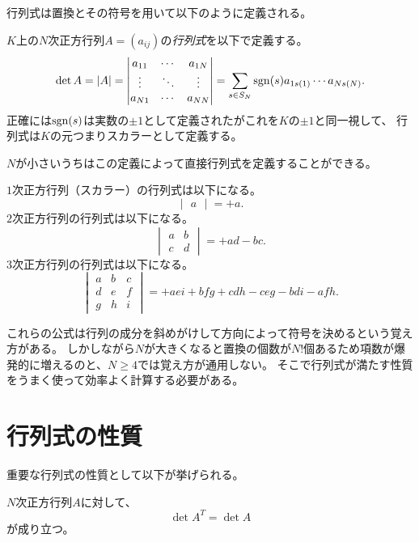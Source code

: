 行列式は置換とその符号を用いて以下のように定義される。

\begin{definition}[行列式]
$K$上の$N$次正方行列$A = (a_{i j})$の\emph{行列式}を以下で定義する。
$$
\det A = \abs{A} =
\begin{vmatrix}
a_{1 1} & \cdots & a_{1 N} \\
\vdots & \ddots & \vdots \\
a_{N 1} & \cdots & a_{N N} \\
\end{vmatrix}
= \sum_{s \in S_N}\operatorname{sgn}(s) a_{1 s(1)}\cdots a_{N s(N)}.
$$
正確には$\operatorname{sgn}(s)$は実数の$\pm 1$として定義されたがこれを$K$の$\pm 1$と同一視して、
行列式は$K$の元つまりスカラーとして定義する。
\end{definition}

$N$が小さいうちはこの定義によって直接行列式を定義することができる。

\begin{proposition}[サラスの公式]
$1$次正方行列（スカラー）の行列式は以下になる。
$$
\begin{vmatrix}a\end{vmatrix}
= +a.
$$
$2$次正方行列の行列式は以下になる。
$$
\begin{vmatrix}a & b \\ c & d\end{vmatrix}
= +a d-b c.
$$
$3$次正方行列の行列式は以下になる。
$$
\begin{vmatrix}a & b & c \\ d & e & f \\ g & h & i\end{vmatrix}
= +a e i+b f g+c d h-c e g-b d i-a f h.
$$
\end{proposition}

これらの公式は行列の成分を斜めがけして方向によって符号を決めるという覚え方がある。
しかしながら$N$が大きくなると置換の個数が$N!$個あるため項数が爆発的に増えるのと、$N \ge 4$では覚え方が通用しない。
そこで行列式が満たす性質をうまく使って効率よく計算する必要がある。

\section{行列式の性質}

重要な行列式の性質として以下が挙げられる。

\begin{proposition}[転置]
$N$次正方行列$A$に対して、
$$
\det A^T = \det A
$$
が成り立つ。
\end{proposition}


